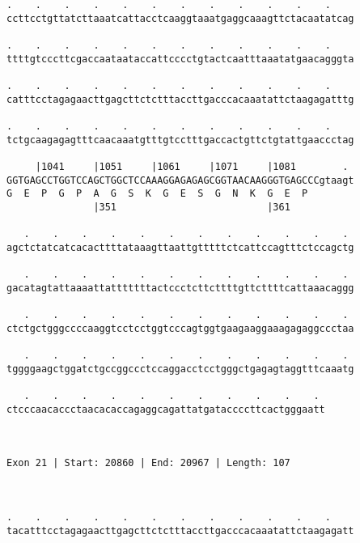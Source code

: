 \documentclass{article}
\begin{document}
\begin{Verbatim}
.    .    .    .    .    .    .    .    .    .    .    .    
ccttcctgttatcttaaatcattacctcaaggtaaatgaggcaaagttctacaatatcag
                                                            
.    .    .    .    .    .    .    .    .    .    .    .    
ttttgtcccttcgaccaataataccattcccctgtactcaatttaaatatgaacagggta
                                                            
.    .    .    .    .    .    .    .    .    .    .    .    
catttcctagagaacttgagcttctctttaccttgacccacaaatattctaagagatttg
                                                            
.    .    .    .    .    .    .    .    .    .    .    .    
tctgcaagagagtttcaacaaatgtttgtcctttgaccactgttctgtattgaaccctag
                                                            
     |1041     |1051     |1061     |1071     |1081        . 
GGTGAGCCTGGTCCAGCTGGCTCCAAAGGAGAGAGCGGTAACAAGGGTGAGCCCgtaagt
G  E  P  G  P  A  G  S  K  G  E  S  G  N  K  G  E  P        
               |351                          |361           
  
   .    .    .    .    .    .    .    .    .    .    .    . 
agctctatcatcacacttttataaagttaattgtttttctcattccagtttctccagctg
                                                            
   .    .    .    .    .    .    .    .    .    .    .    . 
gacatagtattaaaattatttttttactccctcttcttttgttcttttcattaaacaggg
                                                            
   .    .    .    .    .    .    .    .    .    .    .    . 
ctctgctgggccccaaggtcctcctggtcccagtggtgaagaaggaaagagaggccctaa
                                                            
   .    .    .    .    .    .    .    .    .    .    .    . 
tggggaagctggatctgccggccctccaggacctcctgggctgagagtaggtttcaaatg
                                                            
   .    .    .    .    .    .    .    .    .    .    . 
ctcccaacaccctaacacaccagaggcagattatgataccccttcactgggaatt
                                                       
                                                       
 
Exon 21 | Start: 20860 | End: 20967 | Length: 107



.    .    .    .    .    .    .    .    .    .    .    .    
tacatttcctagagaacttgagcttctctttaccttgacccacaaatattctaagagatt
                                                            

\end{Verbatim}
\end{document}
